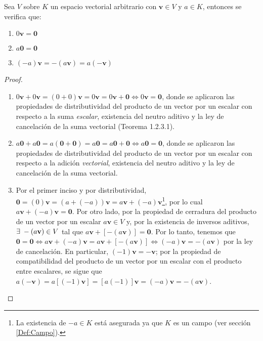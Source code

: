 \documentclass[12pt]{article}
\newenvironment{teorema}[2][Teorema]{\begin{trivlist}
\item[\hskip \labelsep {\bfseries #1}\hskip \labelsep {\bfseries #2.}]}{\end{trivlist}}
\begin{document}
\begin{teorema} {1.2.3.2}
Sea $V$ sobre $K$ un espacio vectorial arbitrario con $\mathbf{v}\in V$ y $a\in K$, entonces se verifica que:

\begin{enumerate}
    \item $0\mathbf{v}=\mathbf{0}$
    \item $a\mathbf{0}=\mathbf{0}$
    \item $(-a)\mathbf{v}=-(a\mathbf{v})=a(-\mathbf{v})$
\end{enumerate}

\begin{proof}
\begin{enumerate}
    \item $0\mathbf{v}+0\mathbf{v}=(0+0)\mathbf{v}=0\mathbf{v}=0\mathbf{v}+\mathbf{0}\iff0\mathbf{v}=\mathbf{0}$, donde se aplicaron las propiedades de distributividad del producto de un vector por un escalar con respecto a la suma \emph{escalar}, existencia del neutro aditivo y la ley de cancelación de la suma vectorial (Teorema 1.2.3.1).
    \item $a\mathbf{0}+a\mathbf{0}=a(\mathbf{0}+\mathbf{0})=a\mathbf{0}=a\mathbf{0}+\mathbf{0}\iff a\mathbf{0}=\mathbf{0}$, donde se aplicaron las propiedades de distributividad del producto de un vector por un escalar con respecto a la adición \emph{vectorial}, existencia del neutro aditivo y la ley de cancelación de la suma vectorial.
    \item Por el primer inciso y por distributividad, $\mathbf{0} = (0)\mathbf{v} = (a+(-a))\mathbf{v}=a\mathbf{v}+(-a)\mathbf{v}$\footnote{La existencia de $-a\in K$ está asegurada ya que $K$ es un campo (ver sección \ref{Def:Campo}).}, por lo cual $a\mathbf{v}+(-a)\mathbf{v}=\mathbf{0}$. Por otro lado, por la propiedad de cerradura del producto de un vector por un escalar $a\mathbf{v}\in V$ y, por la existencia de inversos aditivos, $\exists\hspace{1mm}-(a\mathbf{v})\in V$ tal que $a\mathbf{v}+[-(a\mathbf{v})]=\mathbf{0}$. Por lo tanto, tenemos que $\mathbf{0}=\mathbf{0}\iff a\mathbf{v}+(-a)\mathbf{v}=a\mathbf{v}+[-(a\mathbf{v})]\iff (-a)\mathbf{v}=-(a\mathbf{v})$ por la ley de cancelación. En particular, $(-1)\mathbf{v}=-\mathbf{v}$; por la propiedad de compatibilidad del producto de un vector por un escalar con el producto entre escalares, se sigue que $a(-\mathbf{v})=a[(-1)\mathbf{v}]=[a(-1)]\mathbf{v}=(-a)\mathbf{v}=-(a\mathbf{v})$.
\end{enumerate}
\end{proof}
\end{teorema}
\end{document}
